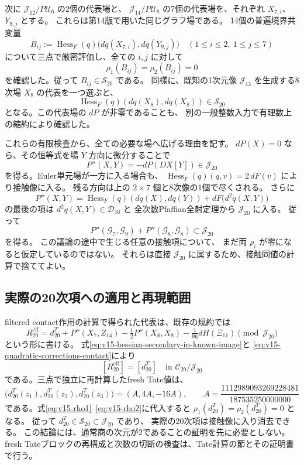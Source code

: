 \documentclass[a4paper,11pt]{ltjsarticle}
\theoremstyle{definition}
\begin{document}
次に $\mathcal J_{12}/P\mathcal U_6$ の2個の代表場と、
$\mathcal J_{14}/P\mathcal U_8$ の7個の代表場を、それぞれ
$X_{7,i}$、$Y_{9,j}$ とする。
これらは第14版で用いた同じグラフ場である。
14個の普遍境界共変量
\[
 B_{ij}:=\operatorname{Hess}_F(q)
          \bigl(dq(X_{7,i}),dq(Y_{9,j})\bigr)
 \quad (1\le i\le2,\ 1\le j\le7)
\]
について三点で厳密評価し、全ての $i,j$ に対して
\[
 \rho_1(B_{ij})=\rho_2(B_{ij})=0
\]
を確認した。従って $B_{ij}\in\mathcal S_{20}$ である。
同様に、既知の1次元像 $\mathcal J_{13}$ を生成する8次場 $X_8$ の代表を一つ選ぶと、
\[
 \operatorname{Hess}_F(q)(dq(X_8),dq(X_8))\in\mathcal S_{20}
\]
となる。この代表場の $dP$ が非零であることも、
別の一般整数入力で有理数上の縮約により確認した。

これらの有限検査から、全ての必要な場へ広げる理由を記す。
$dP(X)=0$ なら、その恒等式を場 $Y$ 方向に微分することで
\[
 P''(X,Y)=-dP(DX[Y])\in\mathcal J_{20}
\]
を得る。Euler単元場が一方に入る場合も、
$\operatorname{Hess}_F(q)(q,v)=2\,dF(v)$ により接触像に入る。
残る方向は上の $2\times7$ 個と8次像の1個で尽くされる。
さらに
\[
 P''(X,Y)=\operatorname{Hess}_F(q)(dq(X),dq(Y))
            +dF\bigl(d^2q(X,Y)\bigr)
\]
の最後の項は $d^2q(X,Y)\in\mathcal D_{16}$ と
全次数Pfaffian全射定理から $\mathcal J_{20}$ に入る。
従って
\begin{equation}\label{eq:v15-quadratic-corrections-contact}
 P''(\mathcal G_7,\mathcal G_9)
  +P''(\mathcal G_8,\mathcal G_8)\subset\mathcal J_{20}
\end{equation}
を得る。
この議論の途中で生じる任意の接触項について、
まだ両 $\rho_i$ が零になると仮定しているのではない。
それらは直接 $\mathcal J_{20}$ に属するため、接触同値の計算で捨ててよい。

\subsection{実際の20次項への適用と再現範囲}

filtered contact作用の計算で得られた代表は、既存の規約では
\[
 R_{20}^{\mathrm{eff}}
 =d_{20}^{T}+P''(X_7,Z_{14})
       -\tfrac12P''(X_8,X_8)-\tfrac1{96}dH(\Xi_{11})
       \pmod{\mathcal J_{20}}
\]
という形に書ける。
式\eqref{eq:v15-hessian-secondary-in-known-image}と
\eqref{eq:v15-quadratic-corrections-contact}により
\[
 [R_{20}^{\mathrm{eff}}]=[d_{20}^{T}]
 \quad\text{in }\mathcal C_{20}/\mathcal J_{20}
\]
である。三点で独立に再計算したfresh Tate値は、
\[
 \bigl(d_{20}^{T}(z_1),d_{20}^{T}(z_2),d_{20}^{T}(z_3)\bigr)
 =(A,4A,-16A),\qquad
 A=\frac{1112989093269228481}{187535250000000}
\]
である。式\eqref{eq:v15-rho1}--\eqref{eq:v15-rho2}に代入すると
$\rho_1(d_{20}^{T})=\rho_2(d_{20}^{T})=0$ となる。
従って $d_{20}^{T}\in\mathcal S_{20}\subset\mathcal J_{20}$ であり、
実際の20次項は接触像に入り消去できる。
この結論には、通常商の次元が2であることの証明を先に必要としない。
fresh Tateブロックの再構成と次数の切断の検査は、Tate計算の節とその証明書で行う。
\end{document}
